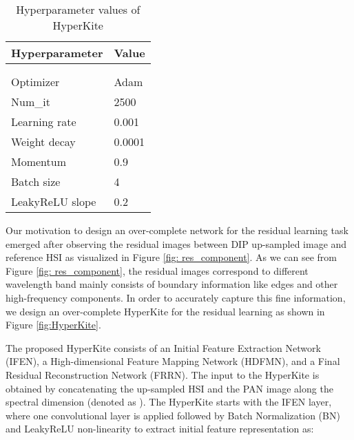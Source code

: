 \documentclass[journal]{IEEEtran}
\begin{document}
    \begin{table}[tb]
        \centering
        \caption{Hyperparameter values of HyperKite}
        \begin{tabular}{ll}
            \hline
            Hyperparameter &  Value\\
            \hline
                         & \\
                         & \\
            Optimizer       & Adam\\
            Num\_it         & 2500\\
            Learning rate   & 0.001\\
            Weight decay    & 0.0001\\
            Momentum        & 0.9\\
            Batch size      & 4\\
            LeakyReLU slope & 0.2\\
            \hline
        \end{tabular}
        \label{tab:HyperKite_hyper}
    \end{table}
    
    \par Our motivation to design an over-complete network for the residual learning task emerged after observing the residual images between DIP up-sampled image  and reference HSI  as  visualized in Figure \ref{fig: res_component}. As we can see from Figure \ref{fig: res_component}, the residual images correspond to different wavelength band mainly consists of boundary information like edges and other high-frequency components. In order to accurately capture this fine information, we design an over-complete HyperKite for the residual learning as shown in Figure \ref{fig:HyperKite}.
    
    The proposed HyperKite consists of an Initial Feature Extraction Network (IFEN), a High-dimensional Feature Mapping Network (HDFMN), and a Final Residual Reconstruction Network (FRRN). The input to the HyperKite  is obtained by concatenating the up-sampled HSI  and the PAN image  along the spectral dimension (denoted as ). The HyperKite starts with the IFEN layer, where one  convolutional layer is applied followed by Batch Normalization (BN) and LeakyReLU non-linearity to extract initial feature representation as:
    
\end{document}
